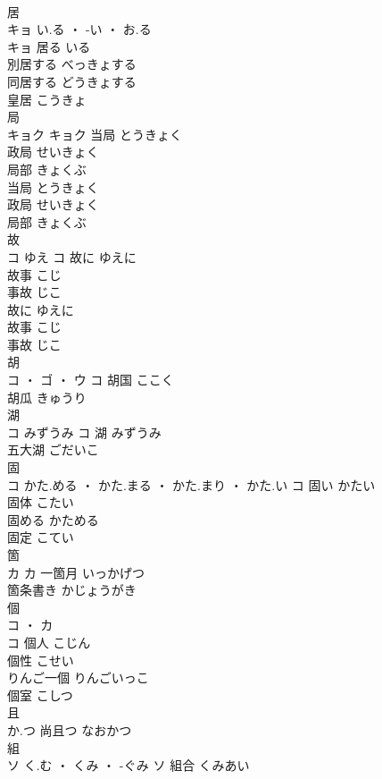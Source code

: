 \documentclass[8pt]{extreport}
\begin{document}
\begin{CJK}{UTF8}{min}
\\	居	
\\	キョ	い.る ・ -い ・ お.る
\\	キョ	居る	いる	
\\	別居する	べっきょする	
\\	同居する	どうきょする	
\\	皇居	こうきょ	
\\	局	
\\	キョク		キョク	当局	とうきょく	
\\	政局	せいきょく	
\\	局部	きょくぶ	
\\	当局	とうきょく	
\\	政局	せいきょく	
\\	局部	きょくぶ	
\\	故	
\\	コ	ゆえ	コ	故に	ゆえに	
\\	故事	こじ	
\\	事故	じこ	
\\	故に	ゆえに	
\\	故事	こじ	
\\	事故	じこ	
\\	胡	
\\	コ ・ ゴ ・ ウ		コ	胡国	ここく	
\\	胡瓜	きゅうり	
\\	湖	
\\	コ	みずうみ	コ	湖	みずうみ	
\\	五大湖	ごだいこ	
\\	固	
\\	コ	かた.める ・ かた.まる ・ かた.まり ・ かた.い	コ	固い	かたい	
\\	固体	こたい	
\\	固める	かためる	
\\	固定	こてい	
\\	箇	
\\	カ		カ	一箇月	いっかげつ	
\\	箇条書き	かじょうがき	
\\	個	
\\	コ ・ カ
\\	コ	個人	こじん	
\\	個性	こせい	
\\	りんご一個	りんごいっこ	
\\	個室	こしつ	
\\	且	
\\	か.つ														尚且つ	なおかつ	
\\	組	
\\	ソ	く.む ・ くみ ・ -ぐみ	ソ	組合	くみあい	

\end{CJK}
\end{document}
